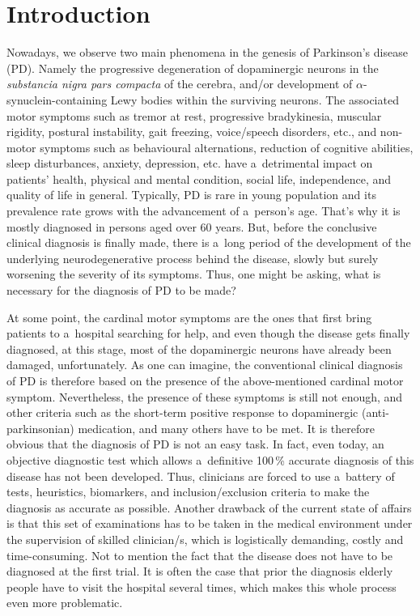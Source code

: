 \chapter*{Introduction}
{}

Nowadays, we observe two main phenomena in the genesis of Parkinson's disease (PD). Namely the progressive degeneration of dopaminergic neurons in the \textit{substancia nigra pars compacta} of the cerebra, and/or development of $\alpha$-synuclein-containing Lewy bodies within the surviving neurons. The associated motor symptoms such as tremor at rest, progressive bradykinesia, muscular rigidity, postural instability, gait freezing, voice/speech disorders, etc., and non-motor symptoms such as behavioural alternations, reduction of cognitive abilities, sleep disturbances, anxiety, depression, etc. have a~detrimental impact on patients' health, physical and mental condition, social life, independence, and quality of life in general. Typically, PD is rare in young population and its prevalence rate grows with the advancement of a~person's age. That's why it is mostly diagnosed in persons aged over $60$ years. But, before the conclusive clinical diagnosis is finally made, there is a~long period of the development of the underlying neurodegenerative process behind the disease, slowly but surely worsening the severity of its symptoms. Thus, one might be asking, what is necessary for the diagnosis of PD to be made?

At some point, the cardinal motor symptoms are the ones that first bring patients to a~hospital searching for help, and even though the disease gets finally diagnosed, at this stage, most of the dopaminergic neurons have already been damaged, unfortunately. As one can imagine, the conventional clinical diagnosis of PD is therefore based on the presence of the above-mentioned cardinal motor symptom. Nevertheless, the presence of these symptoms is still not enough, and other criteria such as the short-term positive response to dopaminergic (anti-parkinsonian) medication, and many others have to be met. It is therefore obvious that the diagnosis of PD is not an easy task. In fact, even today, an objective diagnostic test which allows a~definitive 100\,\% accurate diagnosis of this disease has not been developed. Thus, clinicians are forced to use a~battery of tests, heuristics, biomarkers, and inclusion/exclusion criteria to make the diagnosis as accurate as possible. Another drawback of the current state of affairs is that this set of examinations has to be taken in the medical environment under the supervision of skilled clinician/s, which is logistically demanding, costly and time-consuming. Not to mention the fact that the disease does not have to be diagnosed at the first trial. It is often the case that prior the diagnosis elderly people have to visit the hospital several times, which makes this whole process even more problematic.

